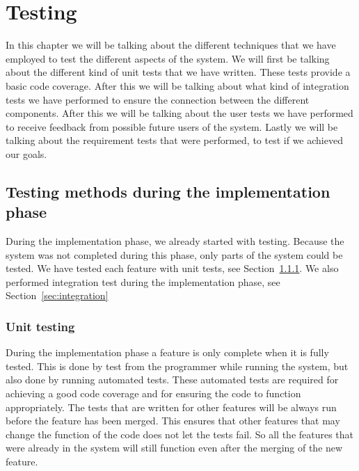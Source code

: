 \chapter{Testing}
\label{sec:testing}
In this chapter we will be talking about the different techniques that we have employed to test the different aspects of the system.
We will first be talking about the different kind of unit tests that we have written.
These tests provide a basic code coverage.
After this we will be talking about what kind of integration tests we have performed to ensure the connection between the different components.
After this we will be talking about the user tests we have performed to receive feedback from possible future users of the system.
Lastly we will be talking about the requirement tests that were performed, to test if we achieved our goals.

\section{Testing methods during the implementation phase}
During the implementation phase, we already started with testing.
Because the system was not completed during this phase, only parts of the system could be tested.
We have tested each feature with unit tests, see Section~\ref{sec:unit_test}.
We also performed integration test during the implementation phase, see Section~\ref{sec:integration}

\subsection{Unit testing}
\label{sec:unit_test}
During the implementation phase a feature is only complete when it is fully tested.
This is done by test from the programmer while running the system, but also done by running automated tests.
These automated tests are required for achieving a good code coverage and for ensuring the code to function appropriately.
The tests that are written for other features will be always run before the feature has been merged.
This ensures that other features that may change the function of the code does not let the tests fail.
So all the features that were already in the system will still function even after the merging of the new feature.


